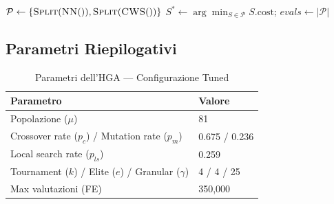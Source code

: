 \begingroup
\scriptsize
\begin{algorithm}[H]
\caption{Ciclo Principale dell'HGA}
\label{alg:hga}

$\mathcal{P} \gets \{\textsc{Split}(\textsc{NN}()), \textsc{Split}(\textsc{CWS}())\}$\;
$S^* \gets \arg\min_{S \in \mathcal{P}} S.\text{cost}$; $evals \gets |\mathcal{P}|$\;

\;
\end{algorithm}
\endgroup

\subsection{Parametri Riepilogativi}

\begin{table}[H]
\centering
\caption{Parametri dell'HGA --- Configurazione Tuned}
\label{tab:params}
\footnotesize
\begin{tabular}{@{}ll@{}}
\toprule
\textbf{Parametro} & \textbf{Valore} \\
\midrule
Popolazione ($\mu$) & 81 \\
Crossover rate ($p_c$) / Mutation rate ($p_m$) & 0.675 / 0.236 \\
Local search rate ($p_{ls}$) & 0.259 \\
Tournament ($k$) / Elite ($e$) / Granular ($\gamma$) & 4 / 4 / 25 \\
Max valutazioni (FE) & 350{,}000 \\
\bottomrule
\end{tabular}
\end{table}

